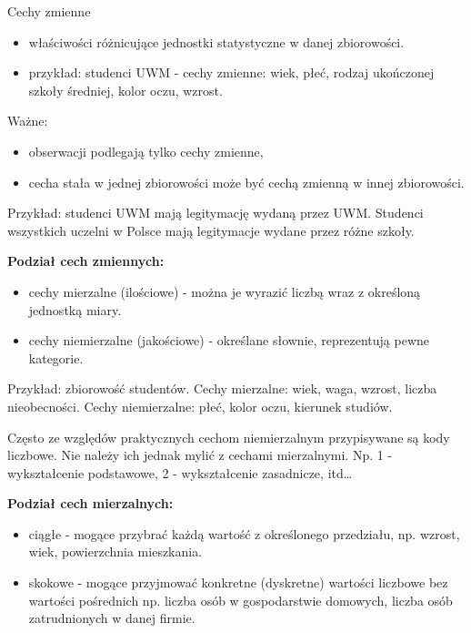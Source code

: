\documentclass[
  letterpaper,
  DIV=11,
  numbers=noendperiod]{scrreprt}
\providecommand{\tightlist}{%
  \setlength{\itemsep}{0pt}\setlength{\parskip}{0pt}}\usepackage{longtable,booktabs,array}
\begin{document}
Cechy zmienne

\begin{itemize}
\tightlist
\item
  właściwości różnicujące jednostki statystyczne w danej zbiorowości.
\item
  przykład: studenci UWM - cechy zmienne: wiek, płeć, rodzaj ukończonej
  szkoły średniej, kolor oczu, wzrost.
\end{itemize}

Ważne:

\begin{itemize}
\tightlist
\item
  obserwacji podlegają tylko cechy zmienne,
\item
  cecha stała w jednej zbiorowości może być cechą zmienną w innej
  zbiorowości.
\end{itemize}

Przykład: studenci UWM mają legitymację wydaną przez UWM. Studenci
wszystkich uczelni w Polsce mają legitymacje wydane przez różne szkoły.

\textbf{Podział cech zmiennych:}

\begin{itemize}
\tightlist
\item
  cechy mierzalne (ilościowe) - można je wyrazić liczbą wraz z określoną
  jednostką miary.
\item
  cechy niemierzalne (jakościowe) - określane słownie, reprezentują
  pewne kategorie.
\end{itemize}

Przykład: zbiorowość studentów. Cechy mierzalne: wiek, waga, wzrost,
liczba nieobecności. Cechy niemierzalne: płeć, kolor oczu, kierunek
studiów.

Często ze względów praktycznych cechom niemierzalnym przypisywane są
kody liczbowe. Nie należy ich jednak mylić z cechami mierzalnymi. Np. 1
- wykształcenie podstawowe, 2 - wykształcenie zasadnicze, itd\ldots{}

\textbf{Podział cech mierzalnych:}

\begin{itemize}
\tightlist
\item
  ciągłe - mogące przybrać każdą wartość z określonego przedziału, np.
  wzrost, wiek, powierzchnia mieszkania.
\item
  skokowe - mogące przyjmować konkretne (dyskretne) wartości liczbowe
  bez wartości pośrednich np. liczba osób w gospodarstwie domowych,
  liczba osób zatrudnionych w danej firmie.
\end{itemize}
\end{document}

